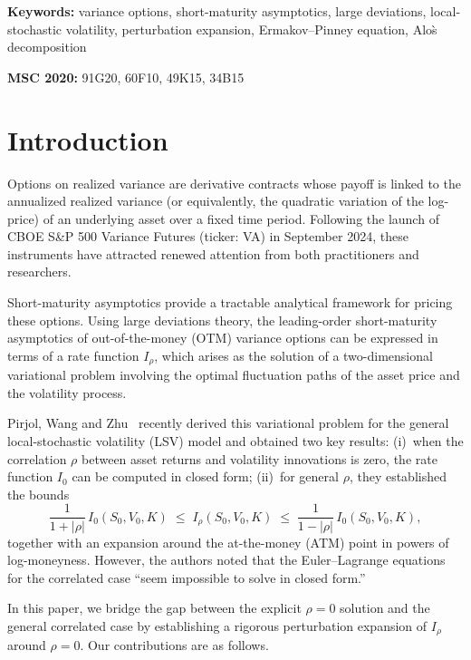 \documentclass[11pt]{article}
\theoremstyle{definition}
\begin{document}
\noindent\textbf{Keywords:} variance options, short-maturity asymptotics, large deviations, local-stochastic volatility, perturbation expansion, Ermakov--Pinney equation, Alo\`s decomposition

\noindent\textbf{MSC 2020:} 91G20, 60F10, 49K15, 34B15

\section{Introduction}\label{sec:intro}

Options on realized variance are derivative contracts whose payoff is linked to the annualized realized variance (or equivalently, the quadratic variation of the log-price) of an underlying asset over a fixed time period. Following the launch of CBOE S\&P 500 Variance Futures (ticker: VA) in September 2024, these instruments have attracted renewed attention from both practitioners and researchers.

Short-maturity asymptotics provide a tractable analytical framework for pricing these options. Using large deviations theory, the leading-order short-maturity asymptotics of out-of-the-money (OTM) variance options can be expressed in terms of a rate function $I_\rho$, which arises as the solution of a two-dimensional variational problem involving the optimal fluctuation paths of the asset price and the volatility process.

Pirjol, Wang and Zhu~\cite{PWZ2025} recently derived this variational problem for the general local-stochastic volatility (LSV) model and obtained two key results: (i)~when the correlation $\rho$ between asset returns and volatility innovations is zero, the rate function $I_0$ can be computed in closed form; (ii)~for general $\rho$, they established the bounds
\begin{equation}\label{eq:PWZ_bounds}
  \frac{1}{1+|\rho|}\, I_0(S_0, V_0, K)
  \;\leq\; I_\rho(S_0, V_0, K)
  \;\leq\; \frac{1}{1-|\rho|}\, I_0(S_0, V_0, K),
\end{equation}
together with an expansion around the at-the-money (ATM) point in powers of log-moneyness. However, the authors noted that the Euler--Lagrange equations for the correlated case ``seem impossible to solve in closed form.''

In this paper, we bridge the gap between the explicit $\rho = 0$ solution and the general correlated case by establishing a rigorous perturbation expansion of $I_\rho$ around $\rho = 0$. Our contributions are as follows.
\end{document}
